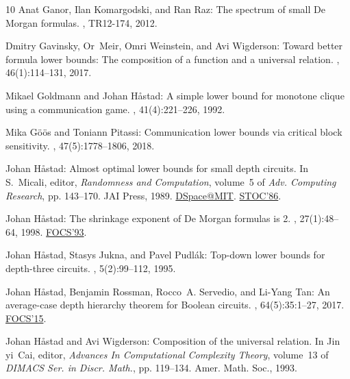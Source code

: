 \documentclass[11pt]{article}
\numberwithin{equation}{section}
\theoremstyle{definition}
\theoremstyle{plain}
\theoremstyle{definition}\newtheorem{notation}[theorem]{Notation}\theoremstyle{plain}
\begin{document}
\begin{thebibliography}{10}
{\sc Anat Ganor, Ilan Komargodski, and Ran Raz}: The spectrum of small {D}e
  {M}organ formulas.
, TR12-174, 2012.

{\sc Dmitry Gavinsky, Or~Meir, Omri Weinstein, and Avi Wigderson}: Toward
  better formula lower bounds: The composition of a function and a universal
  relation.
, 46(1):114--131, 2017.
\newblock [\epfmtdoi{10.1137/15M1018319}]

{\sc Mikael Goldmann and Johan H{\aa}stad}: A simple lower bound for monotone
  clique using a communication game.
, 41(4):221--226, 1992.
\newblock [\epfmtdoi{10.1016/0020-0190(92)90184-W}]

{\sc Mika G{\"{o}}{\"{o}}s and Toniann Pitassi}: Communication lower bounds via
  critical block sensitivity.
, 47(5):1778--1806, 2018.
\newblock [\epfmtdoi{10.1137/16M1082007}]

{\sc Johan H{\aa}stad}: Almost optimal lower bounds for small depth circuits.
\newblock In {\sc S.~Micali}, editor, {\em Randomness and Computation},
  volume~5 of {\em Adv. Computing Research}, pp. 143--170. JAI Press, 1989.
\newblock \href{https://hdl.handle.net/1721.1/151177}{DSpace@MIT}. \prelim
  \href{https://doi.org/10.1145/12130.12132}{STOC'86}.

{\sc Johan H{\aa}stad}: The shrinkage exponent of {D}e {M}organ formulas is 2.
, 27(1):48--64, 1998.
\newblock \prelim \href{https://doi.org/10.1109/SFCS.1993.366876}{FOCS'93}.
\newblock [\epfmtdoi{10.1137/S0097539794261556}]

{\sc Johan H{\aa}stad, Stasys Jukna, and Pavel Pudl{\'a}k}: Top-down lower
  bounds for depth-three circuits.
, 5(2):99--112, 1995.
\newblock [\epfmtdoi{10.1007/BF01268140}]

{\sc Johan H{\aa}stad, Benjamin Rossman, Rocco~A. Servedio, and Li{-}Yang Tan}:
  An average-case depth hierarchy theorem for {B}oolean circuits.
, 64(5):35:1--27, 2017.
\newblock \prelim \href{https://doi.org/10.1109/FOCS.2015.67}{FOCS'15}.
\newblock [\epfmtdoi{10.1145/3095799}]

{\sc Johan H{\aa}stad and Avi Wigderson}: Composition of the universal
  relation.
\newblock In {\sc Jin yi~Cai}, editor, {\em Advances In Computational
  Complexity Theory}, volume~13 of {\em DIMACS Ser. in Discr. Math.}, pp.
  119--134. Amer. Math. Soc., 1993.


\end{thebibliography}
\end{document}
